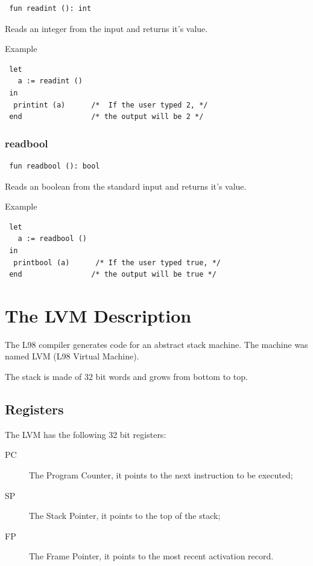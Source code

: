 \documentclass[a4paper, 11pt]{report}
\begin{document}
\begin{lstlisting}
 fun readint (): int
\end{lstlisting}
Reads an integer from the input and returns it's value.


Example
\begin{lstlisting}
 let
   a := readint ()
 in
  printint (a)      /*  If the user typed 2, */
 end                /* the output will be 2 */
\end{lstlisting}


\subsection{readbool}

\begin{lstlisting}
 fun readbool (): bool
\end{lstlisting}
Reads an boolean from the standard input and returns it's value.


Example
\begin{lstlisting}
 let
   a := readbool ()
 in
  printbool (a)      /* If the user typed true, */
 end                /* the output will be true */
\end{lstlisting}

\chapter{The LVM Description}

The L98 compiler generates code for an abstract stack machine. The machine
was named LVM (L98 Virtual Machine).

The stack is made of 32 bit words and grows from bottom to top.

\section{Registers}
The LVM has the following 32 bit registers:

\begin{description}
\item[PC] The Program Counter, it points to the next instruction to be executed;

\item[SP] The Stack Pointer, it points to the top of the stack;

\item[FP] The Frame Pointer, it points to the most recent activation record.
\end{description}
\end{document}
